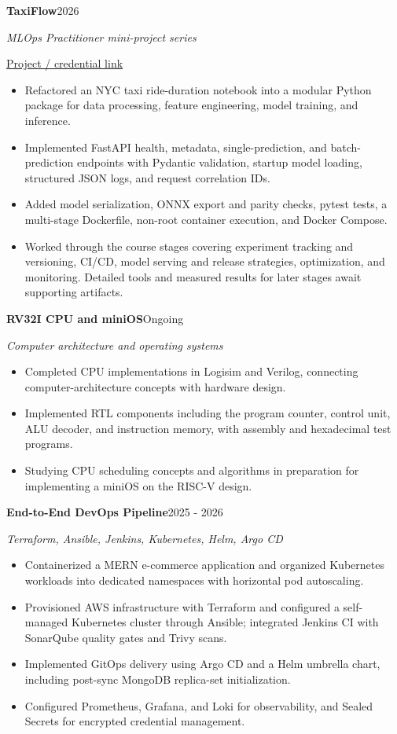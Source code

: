 \documentclass[10pt,a4paper]{article}
\newcommand{\cvitem}[3]{\par\addvspace{4pt}\textbf{#1}\hfill{\small #3}\par{\small\textit{#2}}\par}
\begin{document}
\cvitem{TaxiFlow}{MLOps Practitioner mini-project series}{2026}
{\small\href{https://github.com/abdulrahman-111/mlops-practices_final_project}{Project / credential link}}
\begin{itemize}
\item Refactored an NYC taxi ride-duration notebook into a modular Python package for data processing, feature engineering, model training, and inference.
\item Implemented FastAPI health, metadata, single-prediction, and batch-prediction endpoints with Pydantic validation, startup model loading, structured JSON logs, and request correlation IDs.
\item Added model serialization, ONNX export and parity checks, pytest tests, a multi-stage Dockerfile, non-root container execution, and Docker Compose.
\item Worked through the course stages covering experiment tracking and versioning, CI/CD, model serving and release strategies, optimization, and monitoring. Detailed tools and measured results for later stages await supporting artifacts.
\end{itemize}
\cvitem{RV32I CPU and miniOS}{Computer architecture and operating systems}{Ongoing}
\begin{itemize}
\item Completed CPU implementations in Logisim and Verilog, connecting computer-architecture concepts with hardware design.
\item Implemented RTL components including the program counter, control unit, ALU decoder, and instruction memory, with assembly and hexadecimal test programs.
\item Studying CPU scheduling concepts and algorithms in preparation for implementing a miniOS on the RISC-V design.
\end{itemize}
\cvitem{End-to-End DevOps Pipeline}{Terraform, Ansible, Jenkins, Kubernetes, Helm, Argo CD}{2025 - 2026}
\begin{itemize}
\item Containerized a MERN e-commerce application and organized Kubernetes workloads into dedicated namespaces with horizontal pod autoscaling.
\item Provisioned AWS infrastructure with Terraform and configured a self-managed Kubernetes cluster through Ansible; integrated Jenkins CI with SonarQube quality gates and Trivy scans.
\item Implemented GitOps delivery using Argo CD and a Helm umbrella chart, including post-sync MongoDB replica-set initialization.
\item Configured Prometheus, Grafana, and Loki for observability, and Sealed Secrets for encrypted credential management.
\end{itemize}
\newpage
\end{document}
